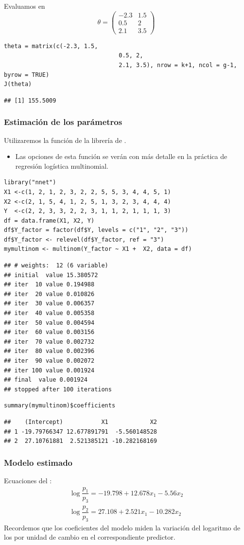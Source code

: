 Evaluamos en \[ \theta=\begin{pmatrix}
	-2.3 & 1.5\\
	0.5 & 2\\
	2.1 & 3.5
\end{pmatrix} \]
\begin{lstlisting}
theta = matrix(c(-2.3, 1.5,
								 0.5, 2,
								 2.1, 3.5), nrow = k+1, ncol = g-1, byrow = TRUE)
J(theta)
\end{lstlisting}
\begin{verbatim}
## [1] 155.5009
\end{verbatim}
\subsubsection{Estimación de los parámetros}
Utilizaremos la función  de la librería  de .
\begin{itemize}
	\item Las opciones de esta función se verán con más detalle en la práctica de regresión logística multinomial.
\end{itemize}
\begin{lstlisting}
library("nnet")
X1 <-c(1, 2, 1, 2, 3, 2, 2, 5, 5, 3, 4, 4, 5, 1)
X2 <-c(2, 1, 5, 4, 1, 2, 5, 1, 3, 2, 3, 4, 4, 4)
Y  <-c(2, 2, 3, 3, 2, 2, 3, 1, 1, 2, 1, 1, 1, 3)
df = data.frame(X1, X2, Y)
df$Y_factor = factor(df$Y, levels = c("1", "2", "3"))
df$Y_factor <- relevel(df$Y_factor, ref = "3")
mymultinom <- multinom(Y_factor ~ X1 +  X2, data = df)
\end{lstlisting}
{\small\begin{verbatim}
## # weights:  12 (6 variable)
## initial  value 15.380572 
## iter  10 value 0.194988
## iter  20 value 0.010826
## iter  30 value 0.006357
## iter  40 value 0.005358
## iter  50 value 0.004594
## iter  60 value 0.003156
## iter  70 value 0.002732
## iter  80 value 0.002396
## iter  90 value 0.002072
## iter 100 value 0.001924
## final  value 0.001924 
## stopped after 100 iterations
\end{verbatim}}
\begin{lstlisting}
summary(mymultinom)$coefficients
\end{lstlisting}
\begin{verbatim}
##    (Intercept)           X1            X2
## 1 -19.79766347 12.677891791  -5.560148528
## 2  27.10761881  2.521385121 -10.282168169
\end{verbatim}
\subsubsection{Modelo estimado}
Ecuaciones del :
\[ \begin{array}{l}
	\log\dfrac{p_1}{p_3}=-19.798+12.678x_1-5.56x_2\\
	\log\dfrac{p_2}{p_3}=27.108+2.521x_1-10.282x_2
\end{array} \]
Recordemos que los coeficientes del modelo miden la variación del logaritmo de los  por unidad de cambio en el correspondiente predictor.

